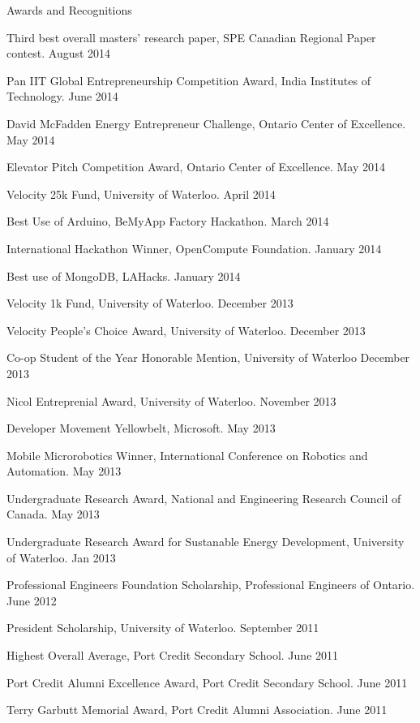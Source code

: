 \documentclass{resume} %
\begin{document}
\begin{rSection}{Awards and Recognitions}

\item Third best overall  masters' research paper,  SPE Canadian Regional Paper contest. August 2014
\item Pan IIT Global Entrepreneurship Competition Award, India Institutes of Technology.  June 2014
\item David McFadden Energy Entrepreneur Challenge, Ontario Center of Excellence. May 2014
\item Elevator Pitch Competition Award, Ontario Center of Excellence.  May 2014
\item Velocity 25k Fund, University of Waterloo.  April 2014
\item Best Use of Arduino, BeMyApp Factory Hackathon. March 2014
\item International Hackathon Winner, OpenCompute Foundation. January 2014
\item Best use of MongoDB, LAHacks. January 2014
\item Velocity 1k Fund, University of Waterloo. December 2013
\item Velocity People's Choice Award, University of Waterloo. December 2013
\item Co-op Student of the Year Honorable Mention, University of Waterloo December 2013
\item Nicol Entreprenial Award, University of Waterloo. November 2013
\item Developer Movement Yellowbelt, Microsoft. May 2013
\item Mobile Microrobotics Winner, International Conference on Robotics and Automation. May 2013
\item Undergraduate Research Award, National and Engineering Research Council of Canada. May 2013
\item Undergraduate Research Award for Sustanable Energy Development, University of Waterloo. Jan 2013
\item Professional Engineers Foundation Scholarship, Professional Engineers of Ontario. June 2012
\item President Scholarship, University of Waterloo. September 2011
\item Highest Overall Average, Port Credit Secondary School.	 June 2011
\item Port Credit Alumni Excellence Award, Port Credit Secondary School. June 2011
\item Terry Garbutt Memorial Award, Port Credit Alumni Association. June 2011

\end{rSection}
\end{document}
